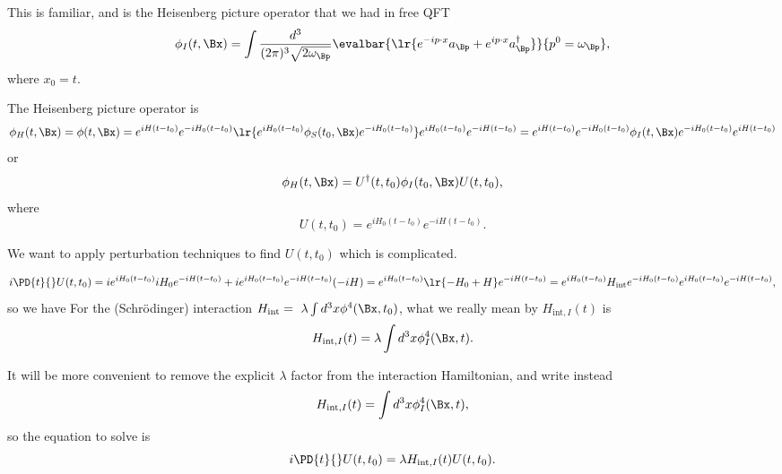 This is familiar, and is the Heisenberg picture operator that we had in free QFT
\begin{dmath}\label{eqn:qftLecture13:700}
\phi_I(t, \Bx) =
\int \frac{d^3}{(2 \pi)^3 \sqrt{ 2 \omega_\Bp } }
\evalbar{
   \lr{
   e^{-i p \cdot x} a_\Bp
   + e^{i p \cdot x} a_\Bp^\dagger }
   }
{
p^0 = \omega_\Bp
},
\end{dmath}
where \( x_0 = t \).

The Heisenberg picture operator is
\begin{dmath}\label{eqn:qftLecture13:720}
\phi_H(t, \Bx)
=
\phi(t, \Bx)
=
e^{i H(t - t_0) }
e^{-i H_0(t - t_0) }
\lr{
   e^{i H_0(t - t_0) }
   \phi_S(t_0, \Bx)
   e^{-i H_0(t - t_0) }
}
e^{i H_0(t - t_0) }
e^{-i H(t - t_0) }
=
e^{i H(t - t_0) }
e^{-i H_0(t - t_0) }
\phi_I(t, \Bx)
e^{-i H_0(t - t_0) }
e^{i H(t - t_0) }
\end{dmath}
or
\begin{dmath}\label{eqn:qftLecture13:760}
\phi_H(t, \Bx)
=
U^\dagger(t, t_0)
\phi_I(t_0, \Bx)
U(t, t_0),
\end{dmath}
where
\begin{dmath}\label{eqn:qftLecture13:740}
U(t, t_0) =
e^{i H_0(t - t_0) }
e^{-i H(t - t_0) }.
\end{dmath}

We want to apply perturbation techniques to find \( U(t, t_0) \) which is complicated.

\begin{dmath}\label{eqn:qftLecture13:780}
i \PD{t}{} U(t, t_0)
=
i e^{i H_0(t - t_0) } i H_0
e^{-i H(t - t_0) }
+
i e^{i H_0(t - t_0) }
e^{-i H(t - t_0) } (-i H)
=
e^{i H_0(t - t_0) }
\lr{ -H_0 + H }
e^{-i H(t - t_0) }
=
e^{i H_0(t - t_0) }
H_{\text{int}}
e^{-i H_0(t - t_0) }
e^{i H_0(t - t_0) }
e^{-i H(t - t_0) },
\end{dmath}
so we have
For the (Schr\"{o}dinger) interaction \( H_{\text{int}} = \
\lambda \int d^3 x \phi^4(\Bx, t_0)  \), what we really mean by
\( H_{\text{int}, I}(t) \) is
\begin{dmath}\label{eqn:qftLecture13:820}
H_{\text{int}, I}(t) = \lambda \int d^3 x \phi_I^4(\Bx, t).
\end{dmath}

It will be more convenient to remove the explicit \( \lambda \) factor from the interaction Hamiltonian, and write instead
\begin{dmath}\label{eqn:qftLecture13:880}
H_{\text{int}, I}(t) = \int d^3 x \phi_I^4(\Bx, t),
\end{dmath}
so the equation to solve is
\begin{dmath}\label{eqn:qftLecture13:1220}
i \PD{t}{} U(t, t_0)
=
\lambda H_{\text{int}, I}(t) U(t, t_0).
\end{dmath}

